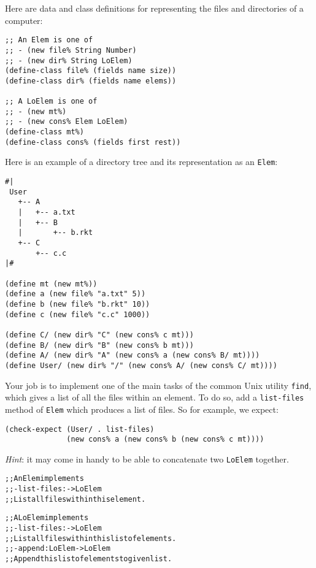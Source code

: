 \documentclass[12pt]{article}                   %
\def\pts#1{\marginpar{\footnotesize \raggedright  \fbox{#1 {\sc Points}}}}
\newenvironment{solution}{\color{Red}}{}
\begin{document}
\begin{problem} \pts{15}

Here are data and class definitions for representing the files and
directories of a computer:

\begin{verbatim}
;; An Elem is one of
;; - (new file% String Number)
;; - (new dir% String LoElem)
(define-class file% (fields name size))
(define-class dir% (fields name elems))

;; A LoElem is one of
;; - (new mt%)
;; - (new cons% Elem LoElem)
(define-class mt%)
(define-class cons% (fields first rest))    
\end{verbatim}


\noindent
Here is an example of a directory tree and its representation as an
\verb|Elem|:
\begin{verbatim}
#|
 User
   +-- A
   |   +-- a.txt
   |   +-- B
   |       +-- b.rkt
   +-- C
       +-- c.c
|#

(define mt (new mt%))
(define a (new file% "a.txt" 5))
(define b (new file% "b.rkt" 10))
(define c (new file% "c.c" 1000))

(define C/ (new dir% "C" (new cons% c mt)))
(define B/ (new dir% "B" (new cons% b mt)))
(define A/ (new dir% "A" (new cons% a (new cons% B/ mt))))
(define User/ (new dir% "/" (new cons% A/ (new cons% C/ mt))))
\end{verbatim}

\newpage
\noindent
Your job is to implement one of the main tasks of the common Unix
utility \verb|find|, which gives a list of all the files within an
element.  To do so, add a \verb|list-files| method of \verb|Elem|
which produces a list of files.  So for example, we expect:
\begin{verbatim}
(check-expect (User/ . list-files) 
              (new cons% a (new cons% b (new cons% c mt))))
\end{verbatim}
\emph{Hint}: it may come in handy to be able to concatenate two
\verb|LoElem| together.

\ifrubric
\else
{}
\fi

\begin{solution}
\begin{alltt}
;; An Elem implements
;; - list-files : -> LoElem
;;   List all files within this element.

;; A LoElem implements
;; - list-files : -> LoElem
;;   List all files within this list of elements.
;; - append : LoElem -> LoElem
;;   Append this list of elements to given list.


\end{alltt}
\end{solution}
\end{problem}
\end{document}
